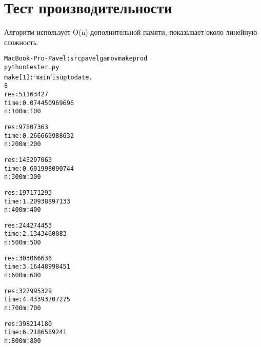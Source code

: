 \section{Тест производительности}

Алгоритм использует O(n) дополнительной памяти, показывает около линейную сложность.

\begin{alltt}
MacBook-Pro-Pavel:src pavelgamov make prod
python tester.py
make[1]: `main' is up to date.
8
res : 51163427
time : 0.074450969696
n: 100 m: 100

res : 97807363
time : 0.266669988632
n: 200 m: 200

res : 145297063
time : 0.601998090744
n: 300 m: 300

res : 197171293
time : 1.20938897133
n: 400 m: 400

res : 244274453
time : 2.1343460083
n: 500 m: 500

res : 303066636
time : 3.16448998451
n: 600 m: 600

res : 327995329
time : 4.43393707275
n: 700 m: 700

res : 398214180
time : 6.2186589241
n: 800 m: 800
\end{alltt}

\pagebreak
